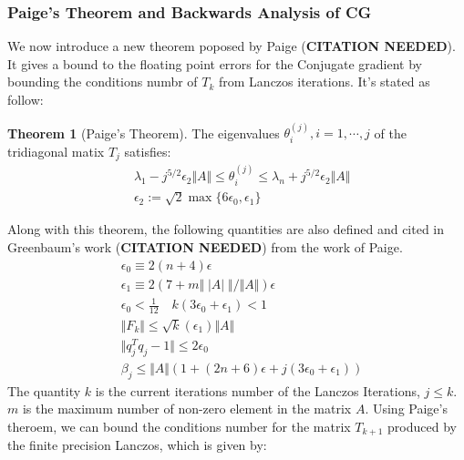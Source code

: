 \documentclass[]{article}
\theoremstyle{definition}
\newtheorem{theorem}{Theorem}            %
\begin{document}
        \subsubsection{Paige's Theorem and Backwards Analysis of CG}
            We now introduce a new theorem poposed by Paige (\textbf{CITATION NEEDED}). It gives a bound to the floating point errors for the Conjugate gradient by bounding the conditions numbr of $T_k$ from Lanczos iterations. It's stated as follow: 
            \begin{theorem}[Paige's Theorem]
                The eigenvalues $\theta_i^{(j)}, i = 1, \cdots, j$ of the tridiagonal matix $T_j$ satisfies: 
                \begin{align}
                    & 
                    \lambda_1 - j^{5/2}\epsilon_2\Vert A\Vert 
                    \le \theta_i^{(j)}
                    \le 
                    \lambda_n + j^{5/2}\epsilon_2\Vert A\Vert
                    \\
                    &
                    \epsilon_2 := \sqrt{2}\max\{6\epsilon_0, \epsilon_1\}
                \end{align}
            \end{theorem}
            Along with this theorem, the following quantities are also defined and cited in Greenbaum's work (\textbf{CITATION NEEDED}) from the work of Paige. 
            \begin{align}
                & \epsilon_0 \equiv 2(n + 4)\epsilon
                \\
                & \epsilon_1 \equiv 2(7 + m \Vert  \;|A|\;\Vert/\Vert A\Vert)\epsilon
                \\
                & \epsilon_0 < \frac{1}{12} \quad k(3\epsilon_0 + \epsilon_1) < 1
                \\
                & \Vert F_k\Vert \le \sqrt{k}(\epsilon_1) \Vert A\Vert
                \\
                & \Vert q^T_jq_j -1\Vert \le 2\epsilon_0
                \\
                & \beta_j \le \Vert A\Vert(1 + (2n + 6)\epsilon + j(3\epsilon_0 + \epsilon_1))
            \end{align}
            The quantity $k$ is the current iterations number of the Lanczos Iterations, $j\le k$. $m$ is the maximum number of non-zero element in the matrix $A$. 
            Using Paige's theroem, we can bound the conditions number for the matrix $T_{k + 1}$ produced by the finite precision Lanczos, which is given by: 
\end{document}
